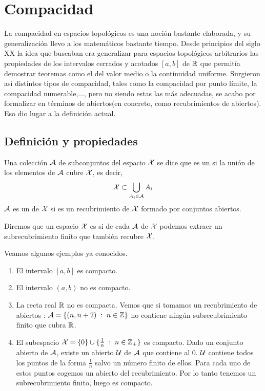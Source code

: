 \chapter{Compacidad}
\label{comp}

La compacidad en espacios topológicos es una noción bastante elaborada, y su generalización llevo a los matemáticos bastante tiempo. Desde principios del siglo XX la idea que buscaban era generalizar para espacios topológicos arbitrarios las propiedades de los intervalos cerrados y acotados $[a,b]$ de $\mathbb{R}$ que permitía demostrar teoremas como el del valor medio o la continuidad uniforme. Surgieron así distintos tipos de compacidad, tales como la compacidad por punto límite, la compacidad numerable,...,  pero no siendo estas las más adecuadas, se acabo por formalizar en términos de abiertos(en concreto, como recubrimientos de abiertos). Eso dio lugar a la definición actual.

\section{Definición y propiedades}

\begin{defi}
	Una colección $\mathcal{A}$ de subconjuntos del espacio $\mathcal{X}$ se dice que es un  si la unión de los elementos de $\mathcal{A}$ cubre $\mathcal{X}$, es decir, $$\mathcal{X} \subset \bigcup_{A_i \in \mathcal{A}}A_i$$ $\mathcal{A}$ es un  de $\mathcal{X}$ si es un recubrimiento de $\mathcal{X}$ formado por conjuntos abiertos.
\end{defi}

\begin{defi}[Compacto]
	Diremos que un espacio $\mathcal{X}$ es   si de cada  $\mathcal{A}$ de $\mathcal{X}$ podemos extraer un subrecubrimiento finito que también recubre $\mathcal{X}$.
\end{defi}

Veamos algunos ejemplos ya conocidos.

\begin{exa}
	\begin{enumerate}
		\item El intervalo $[a,b]$ es compacto.
		\item El intervalo $(a,b)$ no es compacto.
		\item La recta real $\mathbb{R}$ no es compacta. Vemos que si tomamos un recubrimiento de abiertos : $\mathcal{A}=\{(n,n+2) \;:\; n \in \mathbb{Z}\}$ no contiene ningún subrecubrimiento finito que cubra $\mathbb{R}$.
		\item El subespacio $\mathcal{X} = \{0\} \cup \{\frac{1}{n} \;:\; n \in \mathbb{Z}_{+}\}$ es compacto.
		Dado un conjunto abierto de $\mathcal{A}$, existe un abierto $\mathcal{U}$ de $\mathcal{A}$ que contiene al $0$. $\mathcal{U}$ contiene todos los puntos de la forma $\frac{1}{n}$ salvo un número finito de ellos. Para cada uno de estos puntos cogemos un abierto del recubrimiento. Por lo tanto tenemos un subrecubrimiento finito, luego es compacto. 
	\end{enumerate}
\end{exa}

